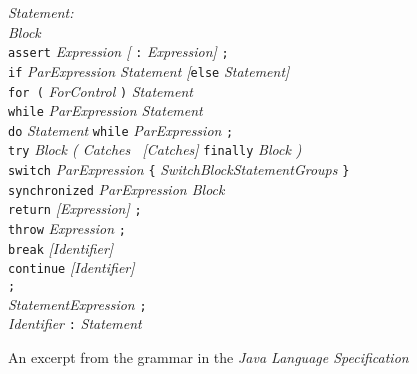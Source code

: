 \begin{figure}
\centering
\begin{minipage}{0.8\linewidth}
\textit{Statement:} \\
\hspace*{1.5em}	\textit{Block} \\
\hspace*{1.5em}	\texttt{assert} \textit{Expression [} \texttt{:} \textit{Expression]} \texttt{;} \\
\hspace*{1.5em}	\texttt{if} \textit{ParExpression Statement [}\texttt{else} \textit{Statement]} \\
\hspace*{1.5em}	\texttt{for (} \textit{ForControl} \texttt{)} \textit{Statement} \\
\hspace*{1.5em}	\texttt{while} \textit{ParExpression Statement} \\
\hspace*{1.5em}	\texttt{do} \textit{Statement} \texttt{while} \textit{ParExpression} \texttt{;} \\
\hspace*{1.5em}	\texttt{try} \textit{Block ( Catches \textpipe\ [Catches]} \texttt{finally} \textit{Block )} \\
\hspace*{1.5em}	\texttt{switch} \textit{ParExpression} \texttt{\{} \textit{SwitchBlockStatementGroups} \texttt{\}} \\
\hspace*{1.5em}	\texttt{synchronized} \textit{ParExpression Block} \\
\hspace*{1.5em}	\texttt{return} \textit{[Expression]} \texttt{;} \\
\hspace*{1.5em}	\texttt{throw} \textit{Expression} \texttt{;} \\
\hspace*{1.5em}	\texttt{break} \textit{[Identifier]} \\
\hspace*{1.5em}	\texttt{continue} \textit{[Identifier]} \\
\hspace*{1.5em}	\texttt{;} \\
\hspace*{1.5em}	\textit{StatementExpression} \texttt{;} \\
\hspace*{1.5em}	\textit{Identifier } \texttt{:} \textit{ Statement}
\end{minipage}
\caption{An excerpt from the grammar in the \textit{Java Language Specification}}
\label{fig:javalanguage}
\end{figure}

